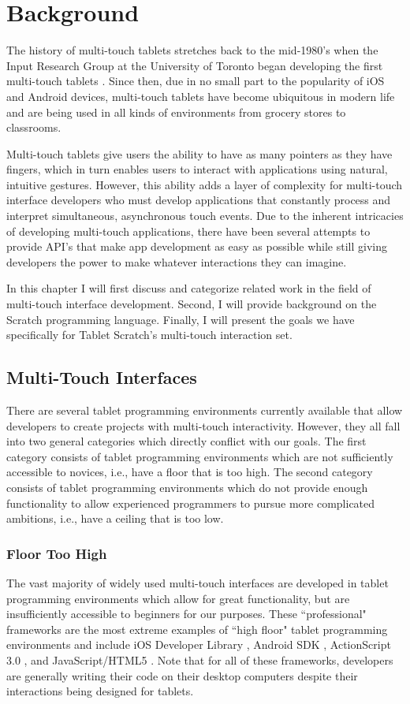 \chapter{Background}
The history of multi-touch tablets stretches back to the mid-1980's when the Input Research Group at the University of Toronto began developing the first multi-touch tablets \cite{LBS, Mehta}. Since then, due in no small part to the popularity of iOS and Android devices, multi-touch tablets have become ubiquitous in modern life and are being used in all kinds of environments from grocery stores to classrooms.

Multi-touch tablets give users the ability to have as many pointers as they have fingers, which in turn enables users to interact with applications using natural, intuitive gestures. However, this ability adds a layer of complexity for multi-touch interface developers who must develop applications that constantly process and interpret simultaneous, asynchronous touch events. Due to the inherent intricacies of developing multi-touch applications, there have been several attempts to provide API's that make app development as easy as possible while still giving developers the power to make whatever interactions they can imagine.

In this chapter I will first discuss and categorize related work in the field of multi-touch interface development. Second, I will provide background on the Scratch programming language. Finally, I will present the goals we have specifically for Tablet Scratch's multi-touch interaction set.
 
\section{Multi-Touch Interfaces}
There are several tablet programming environments currently available that allow developers to create projects with multi-touch interactivity. However, they all fall into two general categories which directly conflict with our goals. The first category consists of tablet programming environments which are not sufficiently accessible to novices, i.e., have a floor that is too high. The second category consists of tablet programming environments which do not provide enough functionality to allow experienced programmers to pursue more complicated ambitions, i.e., have a ceiling that is too low. 

\subsection{Floor Too High}
The vast majority of widely used multi-touch interfaces are developed in tablet programming environments which allow for great functionality, but are insufficiently accessible to beginners for our purposes. These ``professional" frameworks are the most extreme examples of ``high floor" tablet programming environments and include iOS Developer Library \cite{iOS}, Android SDK \cite{Android}, ActionScript 3.0 \cite{ActionScript}, and JavaScript/HTML5 \cite{JavaScript}. Note that for all of these frameworks, developers are generally writing their code on their desktop computers despite their interactions being designed for tablets.

